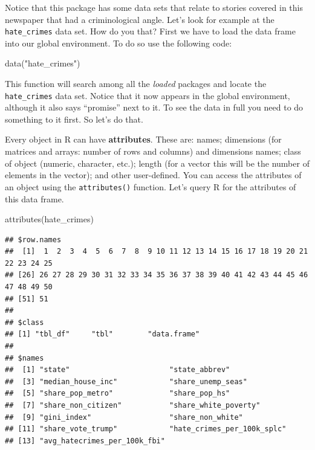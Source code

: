 \documentclass[
]{book}
\newenvironment{Shaded}{\begin{snugshade}}{\end{snugshade}}
\newcommand{\FunctionTok}[1]{\textcolor[rgb]{0.00,0.00,0.00}{#1}}
\newcommand{\NormalTok}[1]{#1}
\newcommand{\StringTok}[1]{\textcolor[rgb]{0.31,0.60,0.02}{#1}}
\begin{document}
Notice that this package has some data sets that relate to stories covered in this newspaper that had a criminological angle. Let's look for example at the \texttt{hate\_crimes} data set. How do you that? First we have to load the data frame into our global environment. To do so use the following code:

\begin{Shaded}
\begin{Highlighting}[]
\FunctionTok{data}\NormalTok{(}\StringTok{"hate\_crimes"}\NormalTok{)}
\end{Highlighting}
\end{Shaded}

This function will search among all the \emph{loaded} packages and locate the \texttt{hate\_crimes} data set. Notice that it now appears in the global environment, although it also says ``promise'' next to it. To see the data in full you need to do something to it first. So let's do that.

Every object in R can have \textbf{attributes}. These are: names; dimensions (for matrices and arrays: number of rows and columns) and dimensions names; class of object (numeric, character, etc.); length (for a vector this will be the number of elements in the vector); and other user-defined. You can access the attributes of an object using the \texttt{attributes()} function. Let's query R for the attributes of this data frame.

\begin{Shaded}
\begin{Highlighting}[]
\FunctionTok{attributes}\NormalTok{(hate\_crimes)}
\end{Highlighting}
\end{Shaded}

\begin{verbatim}
## $row.names
##  [1]  1  2  3  4  5  6  7  8  9 10 11 12 13 14 15 16 17 18 19 20 21 22 23 24 25
## [26] 26 27 28 29 30 31 32 33 34 35 36 37 38 39 40 41 42 43 44 45 46 47 48 49 50
## [51] 51
## 
## $class
## [1] "tbl_df"     "tbl"        "data.frame"
## 
## $names
##  [1] "state"                       "state_abbrev"               
##  [3] "median_house_inc"            "share_unemp_seas"           
##  [5] "share_pop_metro"             "share_pop_hs"               
##  [7] "share_non_citizen"           "share_white_poverty"        
##  [9] "gini_index"                  "share_non_white"            
## [11] "share_vote_trump"            "hate_crimes_per_100k_splc"  
## [13] "avg_hatecrimes_per_100k_fbi"
\end{verbatim}
\end{document}
